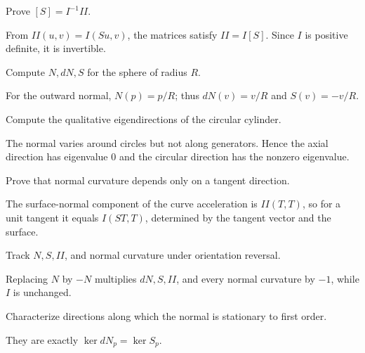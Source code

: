 \begin{problem}\label{prob:vii16-04}
Prove \([S]=I^{-1}II\).
\end{problem}
\begin{solution}
From \(II(u,v)=I(Su,v)\), the matrices satisfy \(II=I[S]\). Since \(I\) is positive definite, it is invertible.
\end{solution}

\begin{problem}\label{prob:vii16-05}
Compute \(N,dN,S\) for the sphere of radius \(R\).
\end{problem}
\begin{solution}
For the outward normal, \(N(p)=p/R\); thus \(dN(v)=v/R\) and \(S(v)=-v/R\).
\end{solution}

\begin{problem}\label{prob:vii16-06}
Compute the qualitative eigendirections of the circular cylinder.
\end{problem}
\begin{solution}
The normal varies around circles but not along generators. Hence the axial direction has eigenvalue \(0\) and the circular direction has the nonzero eigenvalue.
\end{solution}

\begin{problem}\label{prob:vii16-07}
Prove that normal curvature depends only on a tangent direction.
\end{problem}
\begin{solution}
The surface-normal component of the curve acceleration is \(II(T,T)\), so for a unit tangent it equals \(I(ST,T)\), determined by the tangent vector and the surface.
\end{solution}

\begin{problem}\label{prob:vii16-08}
Track \(N,S,II\), and normal curvature under orientation reversal.
\end{problem}
\begin{solution}
Replacing \(N\) by \(-N\) multiplies \(dN,S,II\), and every normal curvature by \(-1\), while \(I\) is unchanged.
\end{solution}

\begin{problem}\label{prob:vii16-09}
Characterize directions along which the normal is stationary to first order.
\end{problem}
\begin{solution}
They are exactly \(\ker dN_p=\ker S_p\).
\end{solution}

